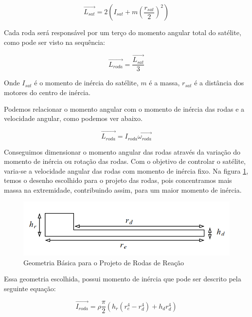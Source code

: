 \begin{equation}
\vec{L_{sat}} = 2\left(I_{sat} + m\left(\frac{r_{sat}}{2}\right)^2\right)  
\end{equation}

Cada roda será responsável por um terço do momento angular total do satélite, como pode ser visto na sequência:

\begin{equation}
\vec{L_{roda}} = \frac{\vec{L_{sat}}}{3}   
\end{equation}

Onde $I_{sat}$ é o momento de inércia do satélite, $m$ é a massa, $r_{sat}$ é a distância dos motores do centro de inércia.

Podemos relacionar o momento angular com o momento de inércia das rodas e a velocidade angular, como podemos ver abaixo.

\begin{equation}
\vec{L_{roda}} = I_{roda}\vec{\omega_{roda}}
\end{equation}

Conseguimos dimensionar o momento angular das rodas através da variação do momento de inércia ou rotação das rodas. Com o objetivo de controlar o satélite, varia-se a velocidade angular das rodas com momento de inércia fixo. Na figura \ref{fig:motor_roda_desenho2}, temos o desenho escolhido para o projeto das rodas, pois concentramos mais massa na extremidade, contribuindo assim, para um maior momento de inércia.

\begin{figure}[H]
  \caption{Geometria Básica para o Projeto de Rodas de Reação}
  \begin{center}
      \includegraphics[scale=.45]{metodologia/img/roda_reacao_modelo}
  \end{center}
  \label{fig:motor_roda_desenho2}
\end{figure}

Essa geometria escolhida, possui momento de inércia que pode ser descrito pela seguinte equação:

\begin{equation}
\vec{I_{roda}} = \rho \frac{\pi}{2}(h_r(r_{e}^4-r_d^4)+h_dr_d^4) 
\end{equation}

